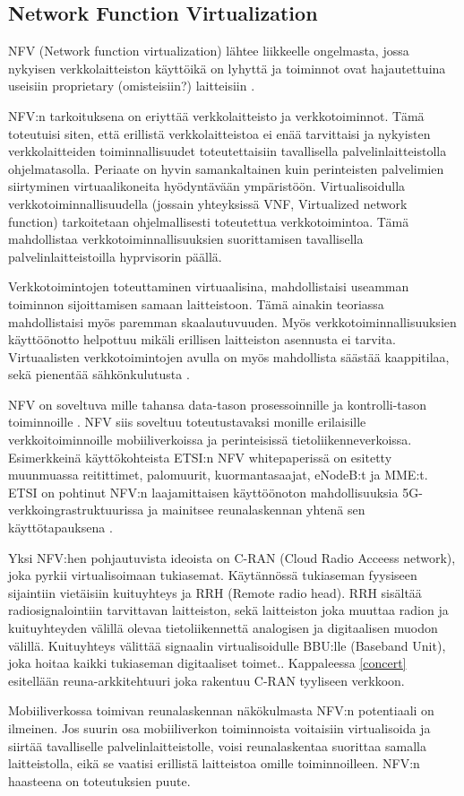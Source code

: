 \subsection{Network Function Virtualization} \label{nfv}
NFV (Network function virtualization) lähtee liikkeelle ongelmasta, jossa nykyisen verkkolaitteiston käyttöikä on lyhyttä ja toiminnot ovat hajautettuina useisiin proprietary (omisteisiin?) laitteisiin \cite{nfvwhite}. 

NFV:n tarkoituksena on eriyttää verkkolaitteisto ja verkkotoiminnot. Tämä toteutuisi siten, että erillistä verkkolaitteistoa ei enää tarvittaisi ja nykyisten verkkolaitteiden toiminnallisuudet toteutettaisiin tavallisella palvelinlaitteistolla ohjelmatasolla. Periaate on hyvin samankaltainen kuin perinteisten palvelimien siirtyminen virtuaalikoneita hyödyntävään ympäristöön.
Virtualisoidulla verkkotoiminnallisuudella (jossain yhteyksissä VNF, Virtualized network function) tarkoitetaan ohjelmallisesti toteutettua verkkotoimintoa. Tämä mahdollistaa verkkotoiminnallisuuksien suorittamisen tavallisella palvelinlaitteistoilla hyprvisorin päällä. 

Verkkotoimintojen toteuttaminen virtuaalisina, mahdollistaisi useamman toiminnon sijoittamisen samaan laitteistoon. Tämä ainakin teoriassa mahdollistaisi myös paremman skaalautuvuuden. Myös verkkotoiminnallisuuksien käyttöönotto helpottuu mikäli erillisen laitteiston asennusta ei tarvita. Virtuaalisten verkkotoimintojen avulla on myös mahdollista säästää kaappitilaa, sekä pienentää sähkönkulutusta \cite{nfvedge}.

NFV on soveltuva mille tahansa data-tason prosessoinnille ja kontrolli-tason toiminnoille \cite{nfvwhite}. NFV siis soveltuu toteutustavaksi monille erilaisille verkkoitoiminnoille mobiiliverkoissa ja perinteisissä tietoliikenneverkoissa. Esimerkkeinä käyttökohteista ETSI:n NFV whitepaperissä on esitetty muunmuassa reitittimet, palomuurit, kuormantasaajat, eNodeB:t ja MME:t. ETSI on pohtinut NFV:n laajamittaisen käyttöönoton mahdollisuuksia 5G-verkkoingrastruktuurissa ja mainitsee reunalaskennan yhtenä sen käyttötapauksena \cite{etsinfv5g}.

Yksi NFV:hen pohjautuvista ideoista on C-RAN (Cloud Radio Acceess network), joka pyrkii virtualisoimaan tukiasemat. Käytännössä tukiaseman fyysiseen sijaintiin vietäisiin kuituyhteys ja RRH (Remote radio head). RRH sisältää radiosignalointiin tarvittavan laitteiston, sekä laitteiston joka muuttaa radion ja kuituyhteyden välillä olevaa tietoliikennettä analogisen ja digitaalisen muodon välillä. Kuituyhteys välittää signaalin virtualisoidulle BBU:lle (Baseband Unit), joka hoitaa kaikki tukiaseman digitaaliset toimet.\cite{C-RANpaperi}. Kappaleessa \ref{concert} esitellään reuna-arkkitehtuuri joka rakentuu C-RAN tyyliseen verkkoon.

Mobiiliverkossa toimivan reunalaskennan näkökulmasta NFV:n potentiaali on ilmeinen. Jos suurin osa mobiiliverkon toiminnoista voitaisiin virtualisoida ja siirtää tavalliselle palvelinlaitteistolle, voisi reunalaskentaa suorittaa samalla laitteistolla, eikä se vaatisi erillistä laitteistoa omille toiminnoilleen.
NFV:n haasteena on toteutuksien puute. 